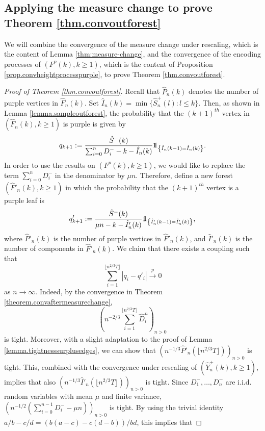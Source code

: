 \subsection{Applying the measure change to prove Theorem \ref{thm.convoutforest}}\label{subsubsec.convaftermeasurechange}

We will combine the convergence of the measure change under rescaling, which is the content of Lemma \ref{thm:measure-change}, and the convergence of the encoding processes of $(F^p(k),k\geq 1)$, which is the content of Proposition \ref{prop.convheightprocesspurple}, to prove Theorem \ref{thm.convoutforest}.

\begin{proof}[Proof of Theorem \ref{thm.convoutforest}]
Recall that $\hat{P}_n(k)$ denotes the number of purple vertices in $\hat{F}_n(k)$. Set $\hat{I}_n(k)=\min\{\hat{S}^{+}_n(l):l\leq k\}$. Then, as shown in Lemma \ref{lemma.sampleoutforest}, the probability that the $(k+1)^{th}$ vertex in $(\hat{F}_n(k),k\geq 1)$ is purple is given by
$$q_{k+1}:=\frac{\hat{S}^-(k)}{\sum_{i=0}^n D^-_i-k-\hat{I}_n(k)}\one_{\left\{\hat{I}_n(k-1)= \hat{I}_n(k)\right\}}.$$
In order to use the results on $(F^p(k),k\geq 1)$, we would like to replace the term $\sum_{i=0}^n D^-_i$ in the denominator by $\mu n$. Therefore, define a new forest $(\hat{F}'_n(k), k\geq 1)$ in which the probability that the $(k+1)^{th}$ vertex is a purple leaf is
$${q}'_{k+1}:=\frac{\hat{S}^-(k)}{\mu n-k-\hat{I}'_n(k)}\one_{\left\{\hat{I}'_n(k-1)=\hat{I}'_n(k)\right\}},$$
where $\hat{P}'_n(k)$ is the number of purple vertices in $\hat{F}'_n(k)$, and $\hat{I}'_n(k)$ is the number of components in $\hat{F}'_n(k)$. 
We claim that there exists a coupling such that
$$\sum_{i=1}^{\lfloor n^{2/3}T\rfloor }|q_i-q'_i|\overset{p}{\to}0$$
as $n\to \infty$. 
Indeed, by the convergence in Theorem \ref{theorem.convaftermeasurechange}, 
$$\left(n^{-2/3}\sum_{i=1}^{\lfloor n^{2/3}T\rfloor} \hat{D}^n_i\right)_{n>0}$$ is tight. Moreover, with a slight adaptation to the proof of Lemma \ref{lemma.tightnesssurplusedges}, we can show that $\left(n^{-1/3}\hat{P}'_n\left(\lfloor n^{2/3}T\rfloor \right)\right)_{n>0}$ is tight. This, combined with the convergence under rescaling of $(\hat{Y}^+_n(k),k\geq 1)$, implies that also $\left(n^{-1/3}\hat{I}'_n\left(\lfloor n^{2/3}T\rfloor \right)\right)_{n>0}$ is tight.  Since $D^-_1,\dots,D^-_n$ are i.i.d. random variables with mean $\mu$ and finite variance,
$\left(n^{-1/2}\left(\sum_{i=0}^{n-1}D^-_i-\mu n\right)\right)_{n>0}$ is tight. By using the trivial identity $a/b-c/d=(b(a-c)-c(d-b))/bd$, this implies that

\end{proof}

